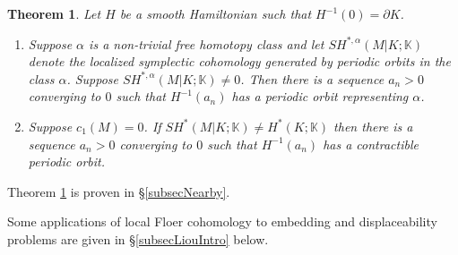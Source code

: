\documentclass[11pt]{amsart}
\newcommand{\K}{\mathbb{K}}
\newtheorem{tm}{Theorem}[section]
\newtheorem{cy}[tm]{Corollary}
\theoremstyle{definition}
\theoremstyle{remark}
\begin{document}
\begin{tm}\label{lmNearbyEx}
Let $H$ be a smooth Hamiltonian such that $H^{-1}(0)=\partial K$.
\begin{enumerate}

\item
Suppose $\alpha$ is a non-trivial free homotopy class and let $SH^{*,\alpha}(M|K;\K)$ denote the localized symplectic cohomology generated by periodic orbits in the class $\alpha$. Suppose $SH^{*,\alpha}(M|K;\K)\neq 0$. Then there is a sequence $a_n>0$ converging to $0$ such that $H^{-1}(a_n)$ has a periodic orbit representing $\alpha$.
\item\label{lmNearbyExPartB}
Suppose $c_1(M)=0$. If $SH^*(M|K;\K)\neq H^*(K;\K)$ then there is a sequence $a_n>0$ converging to $0$ such that $H^{-1}(a_n)$ has a contractible periodic orbit.
\end{enumerate}
\end{tm}
Theorem \ref{lmNearbyEx} is proven in \S \ref{subsecNearby}.

Some applications of local Floer cohomology to embedding and displaceability problems are given in \S \ref{subsecLiouIntro} below.
\end{document}
